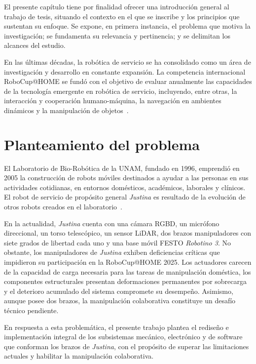 El presente capítulo tiene por finalidad ofrecer una introducción general al trabajo de tesis, situando el contexto en el que se inscribe y los principios que sustentan su enfoque. Se expone, en primera instancia, el problema que motiva la investigación; se fundamenta su relevancia y pertinencia; y se delimitan los alcances del estudio.

En las últimas décadas, la robótica de servicio se ha consolidado como un área de investigación y desarrollo en constante expansión. La competencia internacional RoboCup@HOME se fundó con el objetivo de evaluar anualmente las capacidades de la tecnología emergente en robótica de servicio, incluyendo, entre otras, la interacción y cooperación humano-máquina, la navegación en ambientes dinámicos y la manipulación de objetos~\cite{robocup_athome}.

\section{Planteamiento del problema}

El Laboratorio de Bio-Robótica de la UNAM, fundado en 1996, emprendió en 2005 la construcción de robots móviles destinados a ayudar a las personas en sus actividades cotidianas, en entornos domésticos, académicos, laborales y clínicos. El robot de servicio de propósito general \emph{Justina} es resultado de la evolución de otros robots creados en el laboratorio~\cite{justina_uv}.

En la actualidad, \emph{Justina} cuenta con una cámara RGBD, un micrófono direccional, un torso telescópico, un sensor LiDAR, dos brazos manipuladores con siete grados de libertad cada uno y una base móvil FESTO \emph{Robotino 3}. No obstante, los manipuladores de \emph{Justina} exhiben deficiencias críticas que impidieron su participación en la RoboCup@HOME 2025. Los actuadores carecen de la capacidad de carga necesaria para las tareas de manipulación doméstica, los componentes estructurales presentan deformaciones permanentes por sobrecarga y el deterioro acumulado del sistema compromete su desempeño. Asimismo, aunque posee dos brazos, la manipulación colaborativa constituye un desafío técnico pendiente.

En respuesta a esta problemática, el presente trabajo plantea el rediseño e implementación integral de los subsistemas mecánico, electrónico y de software que conforman los brazos de \emph{Justina}, con el propósito de superar las limitaciones actuales y habilitar la manipulación colaborativa.

